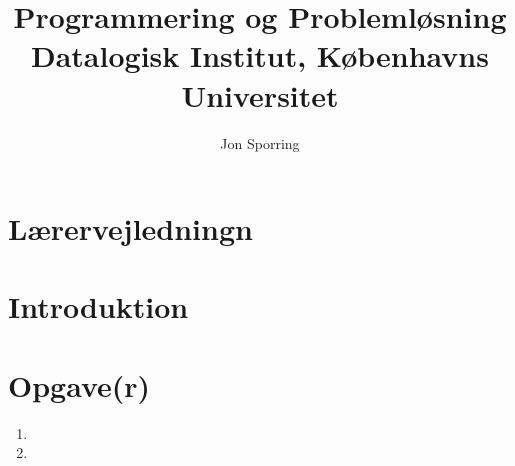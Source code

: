 \documentclass[a4paper,12pt]{article}
\title{Programmering og Problemløsning\\Datalogisk Institut,
  Københavns Universitet}
\author{Jon Sporring}
\begin{document}
\maketitle

\section{Lærervejledningn}

\section{Introduktion}

\section{Opgave(r)}
\begin{enumerate}
\item 
\item 
\end{enumerate}
\end{document}
